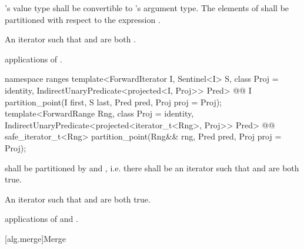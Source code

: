 \begin{itemdescr}
\pnum
\requires
{}'s value type shall be convertible to
's argument type. The elements  of 
shall be partitioned with respect to the expression .

\pnum
\returns An iterator  such that  and  are both .

\pnum
\complexity {} applications of .
\end{itemdescr}

\begin{addedblock}
%
\begin{itemdecl}
namespace ranges {
  template<ForwardIterator I, Sentinel<I> S, class Proj = identity,
      IndirectUnaryPredicate<projected<I, Proj>> Pred>
    @@ I partition_point(I first, S last, Pred pred, Proj proj = Proj{});
  template<ForwardRange Rng, class Proj = identity,
      IndirectUnaryPredicate<projected<iterator_t<Rng>, Proj>> Pred>
    @@ safe_iterator_t<Rng>
      partition_point(Rng&& rng, Pred pred, Proj proj = Proj{});
}
\end{itemdecl}

\begin{itemdescr}
\pnum
\requires {} shall be partitioned by  and , i.e.
there shall be an iterator  such that
 and 
are both true.

\pnum
\returns An iterator  such that  and
 are both true.

\pnum
\complexity {} applications of  and .
\end{itemdescr}
\end{addedblock}

[alg.merge]{Merge}


